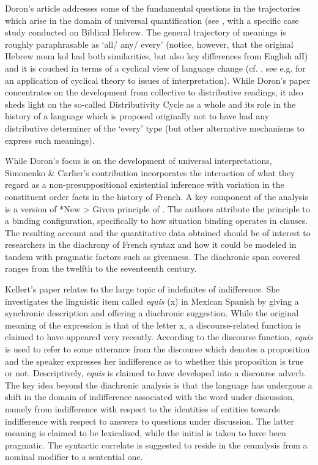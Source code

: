 \documentclass[output=paper]{langsci/langscibook}
\begin{document}
Doron’s article addresses some of the fundamental questions in the trajectories which arise in the domain of universal quantification (see \citet{Fintel95theformal,Haspelmath1995}, \cite{Beck2017} with a specific case study conducted on Biblical Hebrew. The general trajectory of meanings is roughly paraphrasable as ‘all/ any/ every’ (notice, however, that the original Hebrew noun kol had both similarities, but also key differences from English alI) and it is couched in terms of a cyclical view of language change (cf. \citet{Gelderen2011} , see e.g. \citet{Gergel2016} for an application of cyclical theory to issues of interpretation). While Doron’s paper concentrates on the development from collective to distributive readings, it also sheds light on the so-called Distributivity Cycle as a whole and its role in the history of a language which is proposed originally not to have had any distributive determiner of the ‘every’ type (but other alternative mechanisms to express such meanings).

While Doron’s focus is on the development of universal interpretations, Simonenko \& Carlier’s contribution incorporates the interaction of what they regard as a non-presuppositional existential inference with variation in the constituent order facts in the history of French. A key component of the analysis is a version of *New > Given principle of \citet{Kucerova:2012}. The authors attribute the principle to a binding configuration, specifically to how situation binding operates in clauses. The resulting account and the quantitative data obtained should be of interest to researchers in the diachrony of French syntax and how it could be modeled in tandem with pragmatic factors such as givenness. The diachronic span covered ranges from the twelfth to the seventeenth century.

Kellert’s paper relates to the large topic of indefinites of indifference. She investigates the linguistic item called \textit {equis} (x) in Mexican Spanish by giving a synchronic description and offering a diachronic suggestion. While the original meaning of the expression is that of the letter x, a discourse-related function is claimed to have appeared very recently.  According to the discourse function, \textit{equis} is used to refer to some utterance from the discourse which denotes a proposition and the speaker expresses her indifference as to whether this proposition is true or not. Descriptively, \textit{equis} is claimed to have developed into a discourse adverb. The key idea beyond the diachronic analysis is that the language has undergone a shift in the domain of indifference associated with the word under discussion, namely from indifference with respect to the identities of entities towards indifference with respect to answers to questions under discussion. The latter meaning is claimed to be lexicalized, while the initial is taken to have been pragmatic. The syntactic correlate is suggested to reside in the reanalysis from a nominal modifier to a sentential one.
\end{document}
